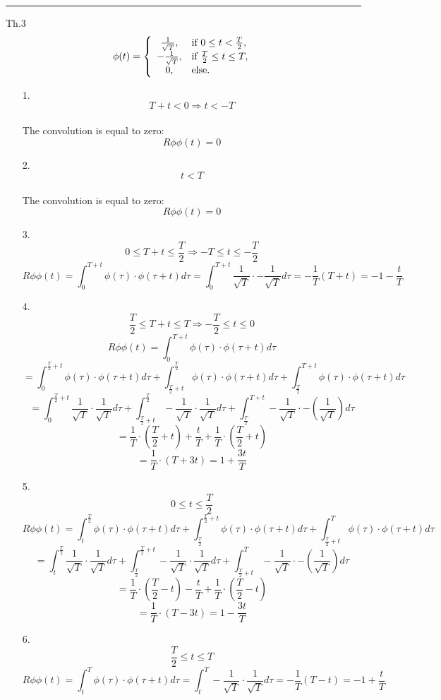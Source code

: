 \documentclass[12pt, a4paper]{article}
\begin{document}
\noindent\rule{\textwidth}{.5pt}
Th.3
\[
\phi(t) = \left\{
\begin{array}{cl} 
\frac{1}{\sqrt{T}}, & \mbox{if}~0\le t< \frac{T}{2},\cr
-\frac{1}{\sqrt{T}}, & \mbox{if}~\frac{T}{2} \le t\le T, \cr
0, & \mbox{else.}
\end{array} \right.
\]
\begin{enumerate}
\item[1.]
\[T + t < 0 \Rightarrow t < -T\]\\
The convolution is equal to zero:\[R\phi\phi(t) = 0\]

\item[2.]
\[ t < T \] \\
The convolution is equal to zero:\[R\phi\phi(t) = 0\]

\item[3.]
\[0 \le T + t \le \frac{T}{2} \Rightarrow -T \le t \le -\frac{T}{2}\]
\[R\phi\phi(t) = \int_{0}^{T + t} \phi(\tau) \cdot \phi(\tau + t)d\tau = 
\int_{0}^{T + t} \frac{1}{\sqrt{T}} \cdot -\frac{1}{\sqrt{T}}d\tau =
-\frac{1}{T}(T + t) = \boxed{-1 - \frac{t}{T}}
\]

\item[4.]
\[\frac{T}{2} \le T + t \le T \Rightarrow -\frac{T}{2} \le  t \le 0\]
\[R\phi\phi(t) = \int_{0}^{T + t} \phi(\tau) \cdot \phi(\tau + t)d\tau \]
\[ = \int_{0}^{\frac{T}{2} + t} \phi(\tau) \cdot \phi(\tau + t)d\tau + \int_{\frac{T}{2} + t}^{\frac{T}{2}} \phi(\tau) \cdot \phi(\tau + t)d\tau + \int_{\frac{T}{2}}^{T + t} \phi(\tau) \cdot \phi(\tau + t)d\tau
\]
\[= \int_{0}^{\frac{T}{2} + t} \frac{1}{\sqrt{T}} \cdot \frac{1}{\sqrt{T}}d\tau+ \int_{\frac{T}{2} + t}^{\frac{T}{2}} -\frac{1}{\sqrt{T}} \cdot \frac{1}{\sqrt{T}}d\tau + \int_{\frac{T}{2}}^{T + t} -\frac{1}{\sqrt{T}} \cdot -(\frac{1}{\sqrt{T}})d\tau\]
\[= \frac{1}{T} \cdot (\frac{T}{2} + t) +\frac{t}{T} + \frac{1}{T} \cdot (\frac{T}{2} + t)\]
\[= \frac{1}{T} \cdot (T + 3t) = \boxed{1 + \frac{3t}{T}}
\]

\item[5.]
\[0 \le t \le \frac{T}{2}\]
\[ R\phi\phi(t) = \int_{t}^{\frac{T}{2}} \phi(\tau) \cdot \phi(\tau + t)d\tau + \int_{\frac{T}{2}}^{\frac{T}{2} + t} \phi(\tau) \cdot \phi(\tau + t)d\tau + \int_{\frac{T}{2} + t}^{T} \phi(\tau) \cdot \phi(\tau + t)d\tau
\]
\[= \int_{t}^{\frac{T}{2}} \frac{1}{\sqrt{T}} \cdot \frac{1}{\sqrt{T}}d\tau+ \int_{\frac{T}{2}}^{\frac{T}{2}+t} -\frac{1}{\sqrt{T}} \cdot \frac{1}{\sqrt{T}}d\tau + \int_{\frac{T}{2} + t}^{T} -\frac{1}{\sqrt{T}} \cdot -(\frac{1}{\sqrt{T}})d\tau\]
\[= \frac{1}{T} \cdot (\frac{T}{2} - t) - \frac{t}{T} + \frac{1}{T} \cdot (\frac{T}{2} - t)\]
\[= \frac{1}{T} \cdot (T - 3t) = \boxed{1 - \frac{3t}{T}}
\]

\item[6.]
\[\frac{T}{2} \le t \le T\]
\[R\phi\phi(t) = \int_{t}^{T} \phi(\tau) \cdot \phi(\tau + t)d\tau = 
\int_{t}^{T} -\frac{1}{\sqrt{T}} \cdot \frac{1}{\sqrt{T}}d\tau =
-\frac{1}{T}(T - t) = \boxed{-1 + \frac{t}{T}}
\]
\end{enumerate}
\end{document}
